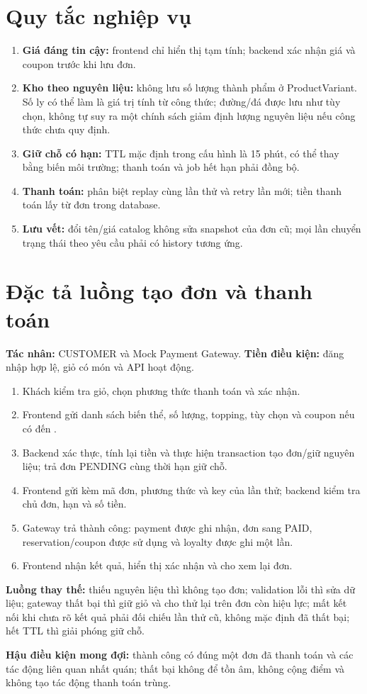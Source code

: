 \section{Quy tắc nghiệp vụ}
\begin{enumerate}[label=BR-\arabic*:,leftmargin=3.8em]
    \item \textbf{Giá đáng tin cậy:} frontend chỉ hiển thị tạm tính;
    backend xác nhận giá và coupon trước khi lưu đơn.
    \item \textbf{Kho theo nguyên liệu:} không lưu số lượng thành phẩm
    ở ProductVariant. Số ly có thể làm là giá trị tính từ công thức;
    đường/đá được lưu như tùy chọn, không tự suy ra một chính sách giảm
    định lượng nguyên liệu nếu công thức chưa quy định.
    \item \textbf{Giữ chỗ có hạn:} TTL mặc định trong cấu hình là 15 phút,
    có thể thay bằng biến môi trường; thanh toán và job hết hạn phải đồng bộ.
    \item \textbf{Thanh toán:} phân biệt replay cùng lần thử và retry
    lần mới; tiền thanh toán lấy từ đơn trong database.
    \item \textbf{Lưu vết:} đổi tên/giá catalog không sửa snapshot của đơn
    cũ; mọi lần chuyển trạng thái theo yêu cầu phải có history tương ứng.
\end{enumerate}

\section{Đặc tả luồng tạo đơn và thanh toán}
\noindent\textbf{Tác nhân:} CUSTOMER và Mock Payment Gateway.
\textbf{Tiền điều kiện:} đăng nhập hợp lệ, giỏ có món và API hoạt động.
\begin{enumerate}
    \item Khách kiểm tra giỏ, chọn phương thức thanh toán và xác nhận.
    \item Frontend gửi danh sách biến thể, số lượng, topping, tùy chọn và
    coupon nếu có đến .
    \item Backend xác thực, tính lại tiền và thực hiện transaction tạo
    đơn/giữ nguyên liệu; trả đơn PENDING cùng thời hạn giữ chỗ.
    \item Frontend gửi  kèm mã đơn, phương thức và
    key của lần thử; backend kiểm tra chủ đơn, hạn và số tiền.
    \item Gateway trả thành công: payment được ghi nhận, đơn sang PAID,
    reservation/coupon được sử dụng và loyalty được ghi một lần.
    \item Frontend nhận kết quả, hiển thị xác nhận và cho xem lại đơn.
\end{enumerate}
\noindent\textbf{Luồng thay thế:} thiếu nguyên liệu thì không tạo đơn;
validation lỗi thì sửa dữ liệu; gateway thất bại thì giữ giỏ và cho thử
lại trên đơn còn hiệu lực; mất kết nối khi chưa rõ kết quả phải đối chiếu
lần thử cũ, không mặc định đã thất bại; hết TTL thì giải phóng giữ chỗ.

\noindent\textbf{Hậu điều kiện mong đợi:} thành công có đúng một đơn đã
thanh toán và các tác động liên quan nhất quán; thất bại không để tồn âm,
không cộng điểm và không tạo tác động thanh toán trùng.

